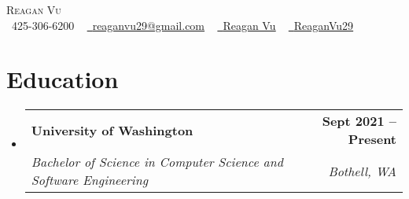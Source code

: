 \documentclass[letterpaper,11pt]{article}
\makeatletter
\newcommand{\resumeSubheading}[4]{
  \vspace{-2pt}\item
    \begin{tabular*}{1.0\textwidth}[t]{l@{\extracolsep{\fill}}r}
      \textbf{#1} & \textbf{\small #2} \\
      \textit{\small#3} & \textit{\small #4} \\
    \end{tabular*}\vspace{-7pt}
}
\newcommand{\resumeSubHeadingListStart}{\begin{itemize}[leftmargin=0.0in, label={}]}
\newcommand{\resumeSubHeadingListEnd}{\end{itemize}}
\makeatother
\begin{document}

\begin{center}
    {\Huge \scshape Reagan Vu} \\ \vspace{1pt}
    \small \raisebox{-0.1\height}\faPhone\ 425-306-6200 ~ \href{mailto:x@gmail.com}{\raisebox{-0.2\height}\faEnvelope\  \underline{reaganvu29@gmail.com}} ~ 
    \href{https://www.linkedin.com/in/reagan-vu-66a922173/}{\raisebox{-0.2\height}\faLinkedin\ \underline{Reagan Vu}}  ~
    \href{https://github.com/ReaganVu29}{\raisebox{-0.2\height}\faGithub\ \underline{ReaganVu29}}
    \vspace{-8pt}
\end{center}


\section{Education}
  \resumeSubHeadingListStart
    \resumeSubheading
      {University of Washington}{Sept 2021 -- Present}
      {Bachelor of Science in Computer Science and Software Engineering}{Bothell, WA}
  \resumeSubHeadingListEnd

\end{document}
